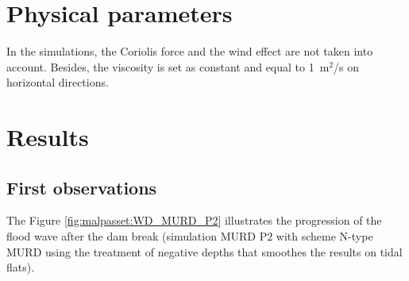 \section{Physical parameters}
In the simulations, the Coriolis force and the wind effect are not taken into account. Besides, the viscosity is set as constant and equal to 1~m$^2$/s on horizontal directions.

\section{Results}

\subsection{First observations}
The Figure \ref{fig:malpasset:WD_MURD_P2} illustrates the progression of the flood wave after the dam
break (simulation MURD P2 with scheme N-type MURD using the treatment of negative depths that
smoothes the results on tidal flats). %

